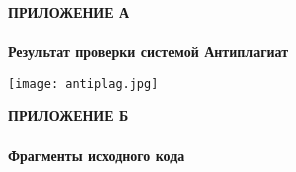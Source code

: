 \begin{center}
\textbf{
\MakeUppercase{Приложение А}\\
\\
Результат проверки системой Антиплагиат}
\end{center}

\begin{center}
\texttt{[image: antiplag.jpg]}
\end{center}
\newpage

\begin{center}
\textbf{
\MakeUppercase{Приложение Б}\\
\\
Фрагменты исходного кода}
\end{center}








